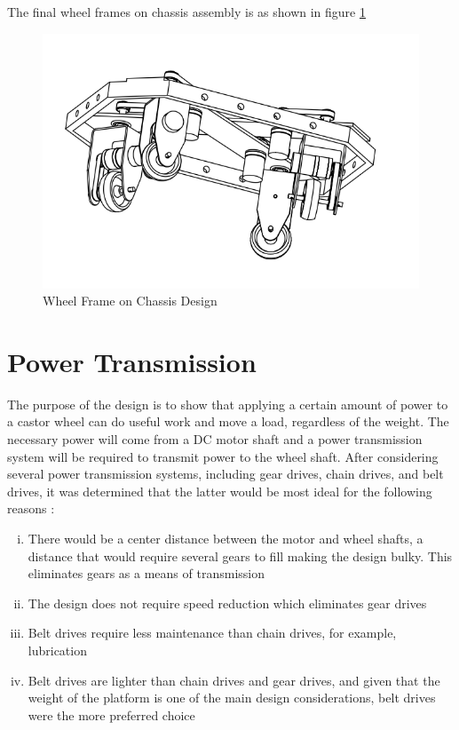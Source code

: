 {\sectionbreak}
The final wheel frames on chassis assembly is as shown in figure \ref{fig:chassiswheel}
\begin{figure}[H]
    \centering
    \includegraphics[scale = 0.8]{Figures/NewFinalAssemblyDWG.png}
    \caption{Wheel Frame on Chassis Design}
    \label{fig:chassiswheel}
\end{figure}

\section{Power Transmission}
The purpose of the design is to show that applying a certain amount of power to a castor wheel can do useful work and move a load, regardless of the weight. The necessary power will come from a \ac{DC} motor shaft and a power transmission system will be required to transmit power to the wheel shaft. After considering several power transmission systems, including gear drives, chain drives, and belt drives, it was determined that the latter would be most ideal for the following reasons \cite{khurmi_textbook_2005}:
\begin{enumerate}[i.]
    \item There would be a center distance between the motor and wheel shafts, a distance that would require several gears to fill making the design bulky. This eliminates gears as a means of transmission
    \item  The design does not require speed reduction which eliminates gear drives
    \item Belt drives require less maintenance than chain drives, for example, lubrication
    \item Belt drives are lighter than chain drives and gear drives, and given that the weight of the platform is one of the main design considerations, belt drives were the more preferred choice
\end{enumerate}

